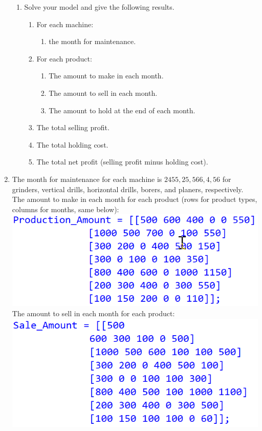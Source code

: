 \documentclass[12pt,a4paper]{article}
\makeatletter
\newtheorem*{solution}{Solution}
\theoremstyle{definition}
\renewenvironment{solution}[1][Solution] {\par\pushQED{\qed}\normalfont\topsep6\p@\@plus6\p@\relax\trivlist\item[\hskip\labelsep\bfseries#1\@addpunct{.}]\ignorespaces}{\popQED\endtrivlist\@endpefalse} \makeatother
\makeatother
\begin{document}
\begin{enumerate}
\begin{enumerate}
		\item
		Solve your model and give the following results.
		\begin{enumerate}
			\item
			For each machine:
			\begin{enumerate}
				\item
				the month for maintenance.
			\end{enumerate}
			\item
			For each product:
			\begin{enumerate}
				\item
				The amount to make in each month.
				\item
				The amount to sell in each month.
				\item
				The amount to hold at the end of each month.
			\end{enumerate}
			\item
			The total selling profit.
			\item
			The total holding cost.
			\item
			The total net profit (selling profit minus holding cost).
		\end{enumerate}
	\end{enumerate}
	\begin{solution}
		The month for maintenance for each machine is $2455, 25, 566, 4, 56$ for grinders, vertical drills, horizontal drills, borers, and planers, respectively. \\
		The amount to make in each month for each product (rows for product types, columns for months, same below): \\
		\includegraphics[scale=0.9]{production.png} \\
		The amount to sell in each month for each product: \\
		\includegraphics[scale=0.9]{sale.png} \\

\end{solution}
\end{enumerate}
\end{document}
